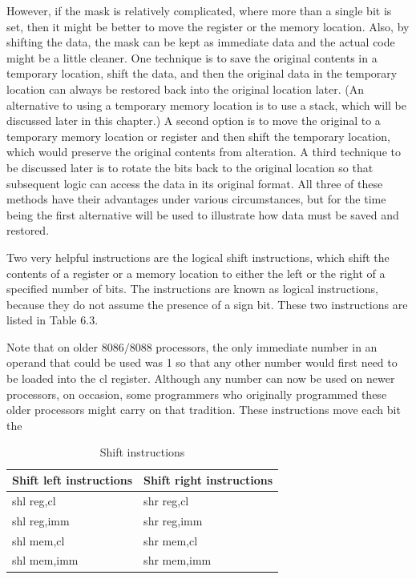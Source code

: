 \documentclass[10pt]{book}
\begin{document}
However, if the mask is relatively complicated, where more than a single bit is set, then it might be better to move the register or the memory location. Also, by shifting the data, the mask can be kept as immediate data and the actual code might be a little cleaner. One technique is to save the original contents in a temporary location, shift the data, and then the original data in the temporary location can always be restored back into the original location later. (An alternative to using a temporary memory location is to use a stack, which will be discussed later in this chapter.) A second option is to move the original to a temporary memory location or register and then shift the temporary location, which would preserve the original contents from alteration. A third technique to be discussed later is to rotate the bits back to the original location so that subsequent logic can access the data in its original format. All three of these methods have their advantages under various circumstances, but for the time being the first alternative will be used to illustrate how data must be saved and restored.

Two very helpful instructions are the logical shift instructions, which shift the contents of a register or a memory location to either the left or the right of a specified number of bits. The instructions are known as logical instructions, because they do not assume the presence of a sign bit. These two instructions are listed in Table 6.3.

Note that on older $8086 / 8088$ processors, the only immediate number in an operand that could be used was 1 so that any other number would first need to be loaded into the cl register. Although any number can now be used on newer processors, on occasion, some programmers who originally programmed these older processors might carry on that tradition. These instructions move each bit the

\begin{table}[htbp]
\centering
\caption{Shift instructions}
\begin{tabular}{ll}
\textbf{Shift left instructions} & \textbf{Shift right instructions} \\
\hline
shl reg,cl & shr reg,cl \\
shl reg,imm & shr reg,imm \\
shl mem,cl & shr mem,cl \\
shl mem,imm & shr mem,imm \\
\end{tabular}
\end{table}
\end{document}
